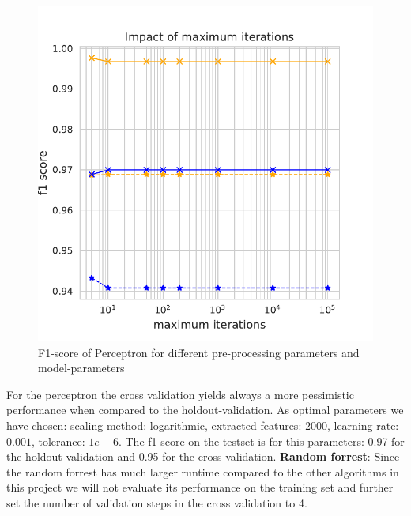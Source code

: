 \documentclass[11pt]{article}
\begin{document}
\begin{figure}
\begin{minipage}[t]{0.3\textwidth}
\end{minipage}
\begin{minipage}[t]{0.3\textwidth}
\includegraphics[width=1\linewidth]{email_spam/perc_maxiter.pdf}
\end{minipage}
\begin{minipage}[t]{0.3\textwidth}

\end{minipage}
   \caption{F1-score of Perceptron for different pre-processing parameters and model-parameters}
\label{spamfig_fig1}
\end{figure}

For the perceptron the cross validation yields always a more pessimistic performance when compared to the holdout-validation. As optimal parameters we have chosen: scaling method: logarithmic, extracted features: $2000$, learning rate: $0.001$, tolerance: $1e-6$. The f1-score on the testset is for this parameters: 0.97 for the holdout validation and 0.95 for the cross validation.
\newline
\textbf{Random forrest}:
Since the random forrest has much larger runtime compared to the other algorithms in this project we will not evaluate its performance on the training set and further set the number of validation steps in the cross validation to 4.
\end{document}
